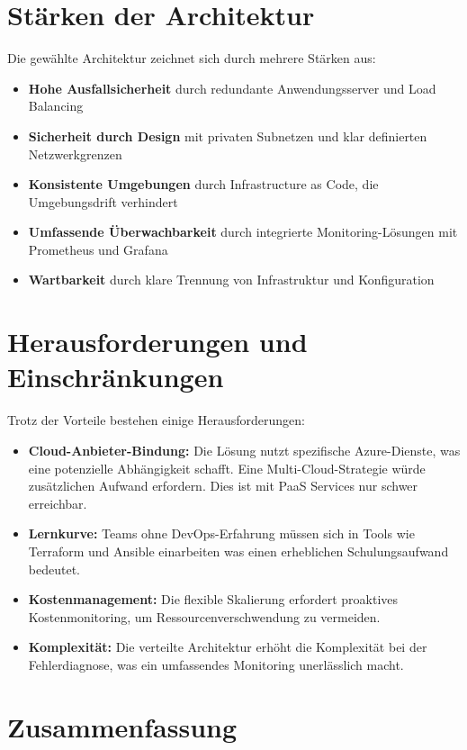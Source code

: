 \section{Stärken der Architektur}

Die gewählte Architektur zeichnet sich durch mehrere Stärken aus:

\begin{itemize}
    \item \textbf{Hohe Ausfallsicherheit} durch redundante Anwendungsserver und Load Balancing
    \item \textbf{Sicherheit durch Design} mit privaten Subnetzen und klar definierten Netzwerkgrenzen
    \item \textbf{Konsistente Umgebungen} durch Infrastructure as Code, die Umgebungsdrift verhindert
    \item \textbf{Umfassende Überwachbarkeit} durch integrierte Monitoring-Lösungen mit Prometheus und Grafana
    \item \textbf{Wartbarkeit} durch klare Trennung von Infrastruktur und Konfiguration
\end{itemize}

\section{Herausforderungen und Einschränkungen}

Trotz der Vorteile bestehen einige Herausforderungen:

\begin{itemize}
    \item \textbf{Cloud-Anbieter-Bindung:} Die Lösung nutzt spezifische Azure-Dienste, was eine potenzielle Abhängigkeit schafft. Eine Multi-Cloud-Strategie würde zusätzlichen Aufwand erfordern. Dies ist mit PaaS Services nur schwer erreichbar.
    \item \textbf{Lernkurve:} Teams ohne DevOps-Erfahrung müssen sich in Tools wie Terraform und Ansible einarbeiten was einen erheblichen Schulungsaufwand bedeutet.
    \item \textbf{Kostenmanagement:} Die flexible Skalierung erfordert proaktives Kostenmonitoring, um Ressourcenverschwendung zu vermeiden.
    \item \textbf{Komplexität:} Die verteilte Architektur erhöht die Komplexität bei der Fehlerdiagnose, was ein umfassendes Monitoring unerlässlich macht.
\end{itemize}

\section{Zusammenfassung}

